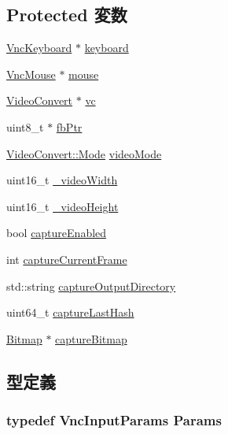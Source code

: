 \subsection*{Protected 変数}
\begin{DoxyCompactItemize}
\item 
\hyperlink{classVncKeyboard}{VncKeyboard} $\ast$ \hyperlink{classVncInput_a185f1d765c763c2a2aae6b2b652a9032}{keyboard}
\item 
\hyperlink{classVncMouse}{VncMouse} $\ast$ \hyperlink{classVncInput_a8cea9cca80c9b50e4cfedb8d1bd90da0}{mouse}
\item 
\hyperlink{classVideoConvert}{VideoConvert} $\ast$ \hyperlink{classVncInput_ad44402c880e7d76c01c4085aeecc8bc0}{vc}
\item 
uint8\_\-t $\ast$ \hyperlink{classVncInput_abb84b49d0d59c2601f33b650316a4c50}{fbPtr}
\item 
\hyperlink{classVideoConvert_a46c8a310cf4c094f8c80e1cb8dc1f911}{VideoConvert::Mode} \hyperlink{classVncInput_a697b3d40f1cd2cf07b3679c99f92efa6}{videoMode}
\item 
uint16\_\-t \hyperlink{classVncInput_a51050d82c013629b320e37c76436d25a}{\_\-videoWidth}
\item 
uint16\_\-t \hyperlink{classVncInput_a4c78948caaa18275e1209fd368b7b3a7}{\_\-videoHeight}
\item 
bool \hyperlink{classVncInput_af27cd54f88185b0f4376abad3cd1a676}{captureEnabled}
\item 
int \hyperlink{classVncInput_aad01931dab0d55404625cb7ac28dc350}{captureCurrentFrame}
\item 
std::string \hyperlink{classVncInput_a6398d687ee470a89c9104f07e58a877d}{captureOutputDirectory}
\item 
uint64\_\-t \hyperlink{classVncInput_abf26b46759231e475b9d70019cdb553b}{captureLastHash}
\item 
\hyperlink{classBitmap}{Bitmap} $\ast$ \hyperlink{classVncInput_a43674e3b3f10249c09c1eefeb039a282}{captureBitmap}
\end{DoxyCompactItemize}


\subsection{型定義}
\hypertarget{classVncInput_a33249bc76b6a23eda274363d6f466b79}{
\subsubsection[{Params}]{\setlength{\rightskip}{0pt plus 5cm}typedef VncInputParams {\bf Params}}}
\label{classVncInput_a33249bc76b6a23eda274363d6f466b79}


